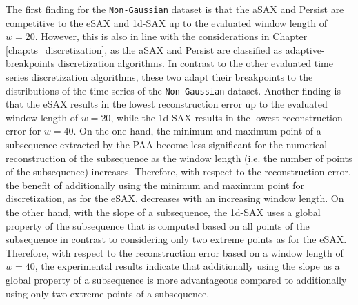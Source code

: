 The first finding for the \texttt{Non-Gaussian} dataset is that the \ac{aSAX} and Persist are competitive to the \ac{eSAX} and \ac{1d-SAX} up to the evaluated window length of $w = 20$. However, this is also in line with the considerations in Chapter \ref{chap:ts_discretization}, as the \ac{aSAX} and Persist are classified as adaptive-breakpoints discretization algorithms. In contrast to the other evaluated time series discretization algorithms, these two adapt their breakpoints to the distributions of the time series of the \texttt{Non-Gaussian} dataset. Another finding is that the \ac{eSAX} results in the lowest reconstruction error up to the evaluated window length of $w = 20$, while the \ac{1d-SAX} results in the lowest reconstruction error for $w = 40$. On the one hand, the minimum and maximum point of a subsequence extracted by the \ac{PAA} become less significant for the numerical reconstruction of the subsequence as the window length (i.e. the number of points of the subsequence) increases. Therefore, with respect to the reconstruction error, the benefit of additionally using the minimum and maximum point for discretization, as for the \ac{eSAX}, decreases with an increasing window length. On the other hand, with the slope of a subsequence, the \ac{1d-SAX} uses a global property of the subsequence that is computed based on all points of the subsequence in contrast to considering only two extreme points as for the \ac{eSAX}. Therefore, with respect to the reconstruction error based on a window length of $w = 40$, the experimental results indicate that additionally using the slope as a global property of a subsequence is more advantageous compared to additionally using only two extreme points of a subsequence. \newline
